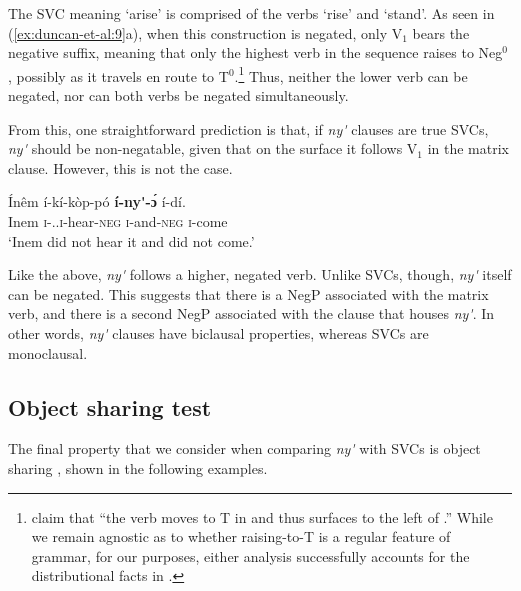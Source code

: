 \documentclass[output=paper]{../langsci/langscibook}
\begin{document}
\noindent The SVC meaning `arise' is comprised of the verbs `rise' and `stand'. As seen in (\ref{ex:duncan-et-al:9}a), when this construction is negated, only V$_1$ bears the negative suffix, meaning that only the highest verb in the sequence raises to Neg$^0$ \citep{duncan-toappear}, possibly as it travels en route to T$^0$.\footnote{\citet[120]{baker2010agreement} claim that ``the verb moves to T in  and thus surfaces to the left of .'' While we remain agnostic as to whether raising-to-T is a regular feature of  grammar, for our purposes, either analysis successfully accounts for the distributional facts in .} Thus, neither the lower verb can be negated, nor can both verbs be negated simultaneously. 

From this, one straightforward prediction is that, if \textit{ny\'{\textturnv}\ng} clauses are true SVCs, \textit{ny\'{\textturnv}\ng} should be non-negatable, given that on the surface it follows V$_1$ in the matrix clause. However, this is not the case.

\ea\label{ex:duncan-et-al:10}
\gll \'{I}n\^{e}m \'{i}-k\'{i}-k\`{o}p-p\'{o} \textbf{\'{i}-ny\'{\textturnv}\ng-\ng \'ɔ} \'{i}-d\'{i}. \\
Inem \textsc{i}-{\pst.\foc}.\textsc{i}-hear-\textsc{neg} \textsc{i}-and-\textsc{neg} \textsc{i}-come \\
\glt ‘Inem did not hear it and did not come.’ \citep[86]{essien1985negation}
\z

\noindent Like the  above, \textit{ny\'{\textturnv}\ng} follows a higher, negated verb. Unlike SVCs, though, \textit{ny\'{\textturnv}\ng} itself can be negated. This suggests that there is a NegP associated with the matrix verb, and there is a second NegP associated with the clause that houses \textit{ny\'{\textturnv}\ng}. In other words, \textit{ny\'{\textturnv}\ng} clauses have biclausal properties, whereas SVCs are monoclausal.

\subsection{Object sharing test}\label{sec:duncan-et-al:2.4}

The final property that we consider when comparing \textit{ny\'{\textturnv}\ng} with SVCs is object sharing \citep{baker1989object}, shown in the following examples.
\end{document}
